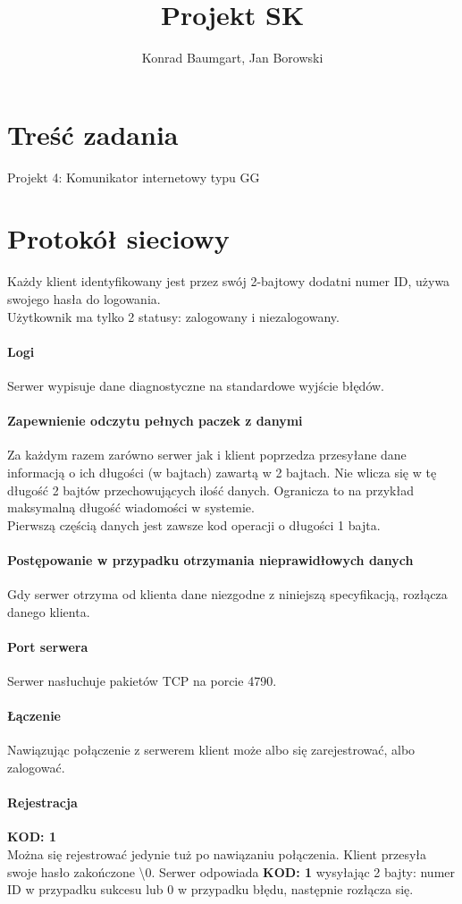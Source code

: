 \documentclass[10pt,a4paper]{article}
\author{Konrad Baumgart, Jan Borowski}
\title{Projekt SK}
\newcommand{\kod}[1]{\textbf{\small{KOD: #1}}}
\begin{document}
\maketitle

\section{Treść zadania}
	Projekt 4: Komunikator internetowy typu GG

\section{Protokół sieciowy}
	Każdy klient identyfikowany jest przez swój 2-bajtowy dodatni numer ID, używa swojego hasła do logowania.\\
	Użytkownik ma tylko 2 statusy: zalogowany i niezalogowany.
	
	\paragraph{Logi}
		Serwer wypisuje dane diagnostyczne na standardowe wyjście błędów.
	\paragraph{Zapewnienie odczytu pełnych paczek z danymi}
		Za każdym razem zarówno serwer jak i klient poprzedza przesyłane dane
		informacją o ich długości (w bajtach) zawartą w 2 bajtach. Nie wlicza się w tę długość
		2 bajtów przechowujących ilość danych.
		Ogranicza to na przykład maksymalną	długość wiadomości w systemie.\\
		Pierwszą częścią danych jest zawsze kod operacji o długości 1 bajta.
	\paragraph{Postępowanie w przypadku otrzymania nieprawidłowych danych}
		Gdy serwer otrzyma od klienta dane niezgodne z niniejszą specyfikacją, rozłącza danego klienta.
	\paragraph{Port serwera} Serwer nasłuchuje pakietów TCP na porcie 4790.
	\paragraph{Łączenie} Nawiązując połączenie z serwerem klient może albo się zarejestrować, albo zalogować.
	\paragraph{Rejestracja}\kod{1}\\
		Można się rejestrować jedynie tuż po nawiązaniu połączenia.
		Klient przesyła swoje hasło zakończone \textbackslash{}0.
		Serwer odpowiada \kod{1} wysyłając 2 bajty: numer ID w przypadku sukcesu lub 0 w przypadku błędu,
		następnie rozłącza się.
\end{document}
